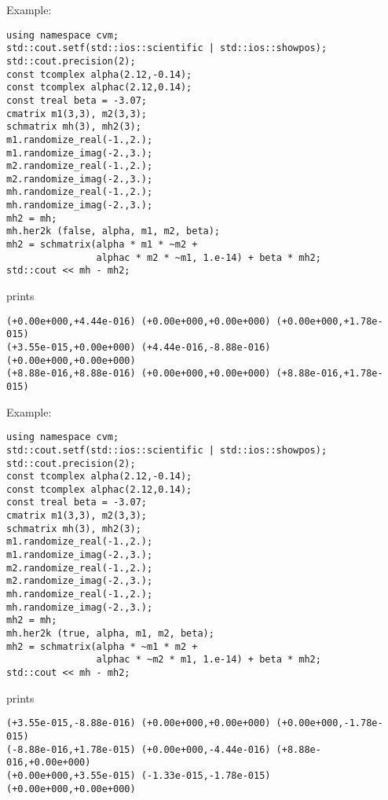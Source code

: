 Example:
\begin{Verbatim}
using namespace cvm;
std::cout.setf(std::ios::scientific | std::ios::showpos); 
std::cout.precision(2);
const tcomplex alpha(2.12,-0.14);
const tcomplex alphac(2.12,0.14);
const treal beta = -3.07;
cmatrix m1(3,3), m2(3,3);
schmatrix mh(3), mh2(3);
m1.randomize_real(-1.,2.);
m1.randomize_imag(-2.,3.);
m2.randomize_real(-1.,2.);
m2.randomize_imag(-2.,3.);
mh.randomize_real(-1.,2.);
mh.randomize_imag(-2.,3.);
mh2 = mh;
mh.her2k (false, alpha, m1, m2, beta);
mh2 = schmatrix(alpha * m1 * ~m2 + 
                alphac * m2 * ~m1, 1.e-14) + beta * mh2;
std::cout << mh - mh2;
\end{Verbatim}
prints
\begin{Verbatim}
(+0.00e+000,+4.44e-016) (+0.00e+000,+0.00e+000) (+0.00e+000,+1.78e-015)
(+3.55e-015,+0.00e+000) (+4.44e-016,-8.88e-016) (+0.00e+000,+0.00e+000)
(+8.88e-016,+8.88e-016) (+0.00e+000,+0.00e+000) (+8.88e-016,+1.78e-015)
\end{Verbatim}
Example:
\begin{Verbatim}
using namespace cvm;
std::cout.setf(std::ios::scientific | std::ios::showpos); 
std::cout.precision(2);
const tcomplex alpha(2.12,-0.14);
const tcomplex alphac(2.12,0.14);
const treal beta = -3.07;
cmatrix m1(3,3), m2(3,3);
schmatrix mh(3), mh2(3);
m1.randomize_real(-1.,2.);
m1.randomize_imag(-2.,3.);
m2.randomize_real(-1.,2.);
m2.randomize_imag(-2.,3.);
mh.randomize_real(-1.,2.);
mh.randomize_imag(-2.,3.);
mh2 = mh;
mh.her2k (true, alpha, m1, m2, beta);
mh2 = schmatrix(alpha * ~m1 * m2 + 
                alphac * ~m2 * m1, 1.e-14) + beta * mh2;
std::cout << mh - mh2;
\end{Verbatim}
prints
\begin{Verbatim}
(+3.55e-015,-8.88e-016) (+0.00e+000,+0.00e+000) (+0.00e+000,-1.78e-015)
(-8.88e-016,+1.78e-015) (+0.00e+000,-4.44e-016) (+8.88e-016,+0.00e+000)
(+0.00e+000,+3.55e-015) (-1.33e-015,-1.78e-015) (+0.00e+000,+0.00e+000)
\end{Verbatim}
\newpage





